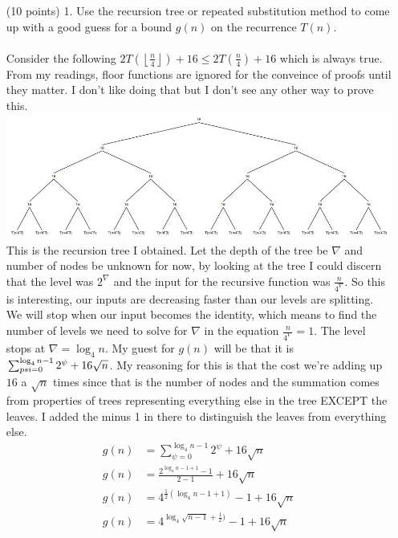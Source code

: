 \documentclass[paper=a4,fontsize=11pt]{article}
\begin{document}
\begin{enumerate}
\begin{enumerate}
\item [(10 points) 1.] Use the recursion tree or repeated substitution method to come up with a good guess for a bound $g (n)$ on the recurrence $T (n)$.\\\\
Consider the following $2T(\left\lfloor\frac{n}{4}\right\rfloor) + 16 \leq 2T(\frac{n}{4}) + 16$ which is always true. From my readings, floor functions are ignored for the conveince of proofs until they matter. I don't like doing that but I don't see any other way to prove this.
\includegraphics[scale = .5]{tree}\\
This is the recursion tree I obtained. Let the depth of the tree be $\nabla$ and number of nodes be unknown for now, by looking at the tree I could discern that the level was $2^{\nabla}$ and the input for the recursive function was $\frac{n}{4^{\nabla}}$. So this is interesting, our inputs are decreasing faster than our levels are splitting. We will stop when our input becomes the identity, which means to find the number of levels we need to solve for $\nabla$ in the equation $\frac{n}{4^{\nabla}} = 1$. The level stops at $\nabla = \log_4{n}$. My guest for $g(n)$ will be that it is $\sum_{\\psi = 0}^{\log_4{n - 1}}2^{\psi} + 16\sqrt{n}$. My reasoning for this is that the cost we're adding up $16$ a $\sqrt{n}$ times since that is the number of nodes and the summation comes from properties of trees representing everything else in the tree EXCEPT the leaves. I added the minus 1 in there to distinguish the leaves from everything else.\\
\begin{align*}
g(n) &= \sum_{\psi = 0}^{\log_4{n - 1}}2^{\psi} + 16\sqrt{n}\\
g(n) &= \frac{2^{\log_4{n - 1} + 1} - 1}{2 - 1} + 16\sqrt{n}\\
g(n) &= 4^{\frac{1}{2}(\log_4{n - 1} + 1)} - 1 + 16\sqrt{n}\\
g(n) &= 4^{\log_4{\sqrt{n - 1}} + \frac{1}{2})} - 1 + 16\sqrt{n}\\

\end{align*}
\end{enumerate}
\end{enumerate}
\end{document}
